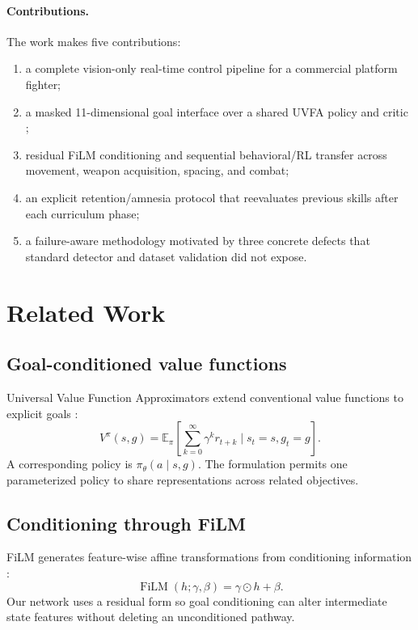 \documentclass[11pt]{article}
\newcommand{\E}{\mathbb{E}}
\begin{document}
\paragraph{Contributions.}
The work makes five contributions:
\begin{enumerate}[leftmargin=1.4em]
  \item a complete vision-only real-time control pipeline for a commercial platform fighter;
  \item a masked 11-dimensional goal interface over a shared UVFA policy and critic \citep{schaul2015uvfa};
  \item residual FiLM conditioning \citep{perez2018film} and sequential behavioral/RL transfer across movement, weapon acquisition, spacing, and combat;
  \item an explicit retention/amnesia protocol that reevaluates previous skills after each curriculum phase;
  \item a failure-aware methodology motivated by three concrete defects that standard detector and dataset validation did not expose.
\end{enumerate}

\section{Related Work}
\subsection{Goal-conditioned value functions}
Universal Value Function Approximators extend conventional value functions to explicit goals \citep{schaul2015uvfa}:
\begin{equation}
V^{\pi}(s,g) = \E_{\pi}\!\left[\sum_{k=0}^{\infty}\gamma^k r_{t+k}\mid s_t=s, g_t=g\right].
\end{equation}
A corresponding policy is $\pi_\theta(a\mid s,g)$. The formulation permits one parameterized policy to share representations across related objectives.

\subsection{Conditioning through FiLM}
FiLM generates feature-wise affine transformations from conditioning information \citep{perez2018film}:
\begin{equation}
\operatorname{FiLM}(h;\gamma,\beta)=\gamma\odot h+\beta.
\end{equation}
Our network uses a residual form so goal conditioning can alter intermediate state features without deleting an unconditioned pathway.
\end{document}
